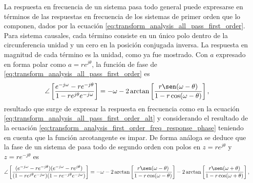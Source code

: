 \documentclass[a4paper]{report}
\begin{document}
La respuesta en frecuencia de un sistema pasa todo general puede expresarse en términos de las respuestas en frecuencia de los sistemas de primer orden que lo componen, dados por la ecuación \ref{eq:transform_analysis_all_pass_first_order}. Para sistema causales, cada término consiste en un único polo dentro de la circunferencia unidad y un cero en la posición conjugada inversa. La respuesta en magnitud de cada término es la unidad, como ya fue mostrado. Con \(a\) expresado en forma polar como \(a=re^{j\theta}\), la función de fase de \ref{eq:transform_analysis_all_pass_first_order} es
\begin{equation}\label{eq:transform_analysis_all_pass_first_order_phase}
 \angle\left[\frac{e^{-j\omega}-re^{-j\theta}}{1-re^{j\theta}e^{-j\omega}}\right]=-\omega-2\arctan\left[\frac{r\sen(\omega-\theta)}{1-r\cos(\omega-\theta)}\right], 
\end{equation}
resultado que surge de expresar la respuesta en frecuencia como en la ecuación \ref{eq:transform_analysis_all_pass_first_order_alt} y considerando el resultado de la ecuación \ref{eq:transform_analysis_first_order_freq_response_phase} teniendo en cuenta que la función arcotangente es impar. De forma análoga se deduce que la fase de un sistema de pasa todo de segundo orden con polos en \(z=re^{j\theta}\) y \(z=re^{-j\theta}\) es
\[
 \angle\left[\frac{(e^{-j\omega}-re^{-j\theta})(e^{-j\omega}-re^{j\theta})}{(1-re^{j\theta}e^{-j\omega})(1-re^{-j\theta}e^{-j\omega})}\right]=-\omega-2\arctan\left[\frac{r\sen(\omega-\theta)}{1-r\cos(\omega-\theta)}\right]
 -2\arctan\left[\frac{r\sen(\omega+\theta)}{1-r\cos(\omega+\theta)}\right],
\]
\end{document}
